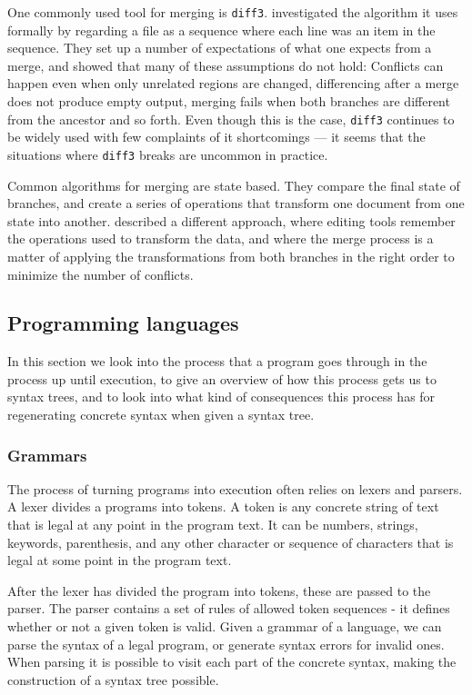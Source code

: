 \documentclass[11pt]{article}
\begin{document}
One commonly used tool for merging is \texttt{diff3}. \citet{Khanna} investigated the algorithm it uses formally by regarding a file as a sequence where each line was an item in the sequence. They set up a number of expectations of what one expects from a merge, and showed that many of these assumptions do not hold: Conflicts can happen even when only unrelated regions are changed, differencing after a merge does not produce empty output, merging fails when both branches are different from the ancestor and so forth. Even though this is the case, \texttt{diff3} continues to be widely used with few complaints of it shortcomings --- it seems that the situations where \texttt{diff3} breaks are uncommon in practice.

Common algorithms for merging are state based. They compare the final state of branches, and create a series of operations that transform one document from one state into another. \citet{Lippe} described a different approach, where editing tools remember the operations used to transform the data, and where the merge process is a matter of applying the transformations from both branches in the right order to minimize the number of conflicts.



\subsection{Programming languages}
In this section we look into the process that a program goes through in the process up until execution, to give an overview of how this process gets us to syntax trees, and to look into what kind of consequences this process has for regenerating concrete syntax when given a syntax tree.

\subsubsection{Grammars}
The process of turning programs into execution often relies on lexers and parsers. A lexer divides a programs into tokens. A token is any concrete string of text that is legal at any point in the program text. It can be numbers, strings, keywords, parenthesis, and any other character or sequence of characters that is legal at some point in the program text. 

After the lexer has divided the program into tokens, these are passed to the parser. The parser contains a set of rules of allowed token sequences - it defines whether or not a given token is valid. Given a grammar of a language, we can parse the syntax of a legal program, or generate syntax errors for invalid ones. When parsing it is possible to visit each part of the concrete syntax, making the construction of a syntax tree possible.
\end{document}
